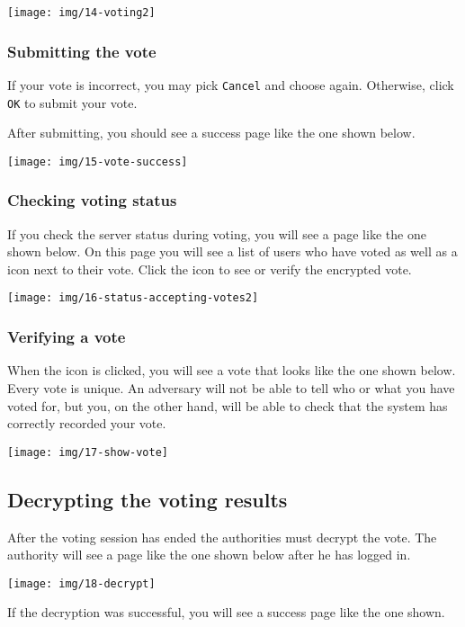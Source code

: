 \documentclass[letterpaper,10pt]{article}
\begin{document}
\texttt{[image: img/14-voting2]}

\subsubsection{Submitting the vote}

If your vote is incorrect, you may pick \texttt{Cancel} and choose
again. Otherwise, click \texttt{OK} to submit your vote.

After submitting, you should see a success page like the one shown
below.

\texttt{[image: img/15-vote-success]}

\subsubsection{Checking voting status}

If you check the server status during voting, you will see a page
like the one shown below. On this page you will see a list of users
who have voted as well as a icon next to their vote. Click the icon
to see or verify the encrypted vote.

\texttt{[image: img/16-status-accepting-votes2]}

\subsubsection{Verifying a vote}

When the icon is clicked, you will see a vote that looks like the
one shown below. Every vote is unique. An adversary will not be able
to tell who or what you have voted for, but you, on the other hand,
will be able to check that the system has correctly recorded your
vote.

\texttt{[image: img/17-show-vote]}

\subsection{Decrypting the voting results}

After the voting session has ended the authorities must decrypt the
vote. The authority will see a page like the one shown below after
he has logged in.

\texttt{[image: img/18-decrypt]}

If the decryption was successful, you will see a success page like
the one shown.
\end{document}
